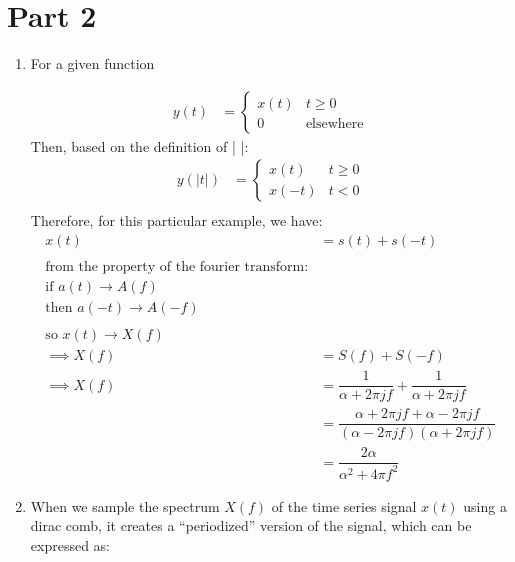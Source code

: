 \documentclass[12pt]{article}
\begin{document}
\section*{Part 2}
\begin{enumerate}


\item{ For a given function

\begin{align*}
y(t) &= \left\lbrace\begin{array}{ll}
x(t) & t\geq 0\\
0 & \text{elsewhere}
\end{array}\right.
\end{align*}
Then, based on the definition of | |:
\begin{align*}
y(|t|) &= \left\lbrace\begin{array}{ll}
x(t) & t\geq 0\\
x(-t) & t < 0
\end{array}\right. \\
\end{align*} 
Therefore, for this particular example, we have:
\begin{align*}
x(t) &= s(t) + s(-t) \\ \\
\text{from the property of the fourier transform:} \\
\text{if } a(t) \rightarrow A(f) \\
\text{then } a(-t) \rightarrow A(-f) \\ \\
\text{so } x(t) \rightarrow X(f) \\
\implies X(f) &= S(f) + S(-f)\\
\implies  X(f) &= \dfrac{1}{\alpha + 2\pi j f} + \dfrac{1}{\alpha + 2\pi j f}\\
&=  \dfrac{\alpha + 2\pi j f + \alpha - 2\pi j f}{(\alpha - 2\pi j f)(\alpha + 2\pi j f)}\\
&= \dfrac{2\alpha}{\alpha^2 + 4\pi f^2}
\end{align*}
}
\item{
When we sample the spectrum $X(f)$ of the time series signal $x(t)$ using a dirac comb, it creates a ``periodized'' version of the signal, which can be expressed as:

}
\end{enumerate}
\end{document}
